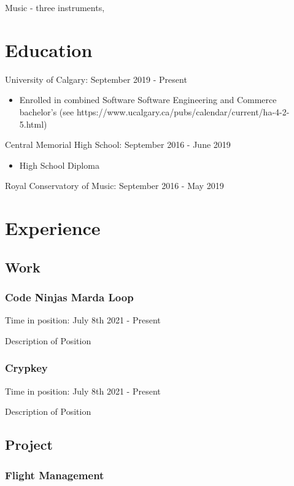 \documentclass{article}
\begin{document}
Music - three instruments,

\section{Education}

University of Calgary: September 2019 - Present
\begin{itemize}
\item Enrolled in combined Software Software Engineering and Commerce
bachelor's (see https://www.ucalgary.ca/pubs/calendar/current/ha-4-2-5.html)
\end{itemize}

Central Memorial High School: September 2016 - June 2019
\begin{itemize}
\item High School Diploma
\end{itemize}

Royal Conservatory of Music: September 2016 - May 2019

\section{Experience}

\subsection{Work}

\subsubsection{Code Ninjas Marda Loop}

Time in position: July 8th 2021 - Present

Description of Position

\subsubsection{Crypkey}

Time in position: July 8th 2021 - Present

Description of Position

\subsection{Project}

\subsubsection{Flight Management}
\end{document}
